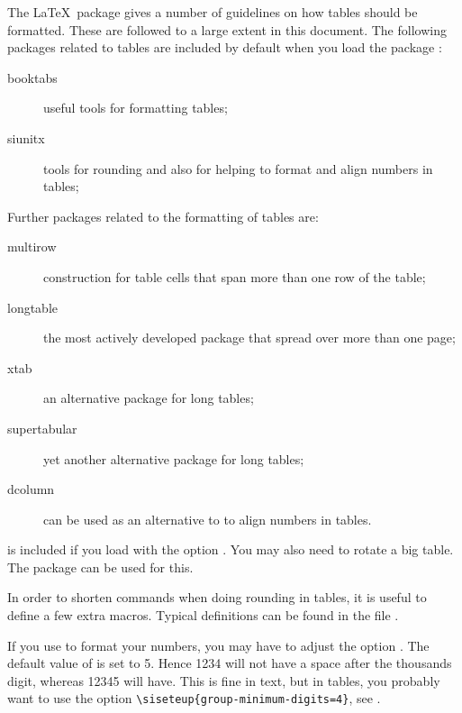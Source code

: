 \documentclass[UKenglish, texlive=2020]{atlasdoc}
\begin{document}
The \LaTeX\ package  gives a number of guidelines on how tables should be formatted.
These are followed to a large extent in this document.
The following packages related to tables are included by default when you load the package :
\begin{description}
\item[booktabs] useful tools for formatting tables;
\item[siunitx] tools for rounding and also for helping to format and align numbers in tables;
\end{description}
Further packages related to the formatting of tables are:
\begin{description}
\item[multirow] construction for table cells that span more than one row of the table;
\item[longtable] the most actively developed package that spread over more than one page;
\item[xtab] an alternative package for long tables;
\item[supertabular] yet another alternative package for long tables;
\item[dcolumn] can be used as an alternative to  to align numbers in tables.
\end{description}
 is included if you load  with the option .
You may also need to rotate a big table.
The  package can be used for this.

In order to shorten commands when doing rounding in tables, it is useful to define a few extra macros.
Typical definitions can be found in the file .

If you use  to format your numbers,
you may have to adjust the option .
 The default value of  is set to 5.
Hence \num{1234} will not have a space after the thousands digit,
whereas \num{12345} will have.
This is fine in text, but in tables, you probably want to use the option
\verb|\siseteup{group-minimum-digits=4}|,
see .
\end{document}
